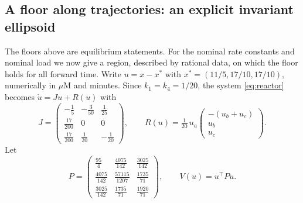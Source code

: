 \documentclass[11pt,a4paper]{article}
\theoremstyle{plain}
\theoremstyle{definition}
\theoremstyle{remark}
\newcommand{\muM}{\mu\mathrm{M}}
\begin{document}
\subsection{A floor along trajectories: an explicit invariant ellipsoid}

The floors above are equilibrium statements. For the nominal rate constants and nominal load we now give a region, described by rational data, on which the floor holds for all forward time. Write $u=x-x^*$ with $x^*=(11/5,17/10,17/10)$, numerically in $\muM$ and minutes. Since $k_1=k_4=1/20$, the system \eqref{eq:reactor} becomes $\dot u=Ju+R(u)$ with
\begin{equation}\label{eq:JR}
 J=\begin{pmatrix}-\tfrac15&-\tfrac3{50}&\tfrac1{25}\\[2pt] \tfrac{17}{200}&0&0\\[2pt] \tfrac{17}{200}&\tfrac1{20}&-\tfrac1{20}\end{pmatrix},
 \qquad
 R(u)=\tfrac1{20}\,u_a\begin{pmatrix}-(u_b+u_c)\\u_b\\u_c\end{pmatrix}.
\end{equation}
Let
\begin{equation}\label{eq:P}
 P=\begin{pmatrix}\tfrac{95}{4}&\tfrac{4075}{142}&\tfrac{3025}{142}\\[3pt] \tfrac{4075}{142}&\tfrac{57115}{1207}&\tfrac{1735}{71}\\[3pt] \tfrac{3025}{142}&\tfrac{1735}{71}&\tfrac{1920}{71}\end{pmatrix},\qquad V(u)=u^{\!\top}Pu .
\end{equation}
\end{document}
